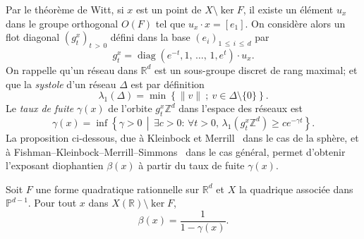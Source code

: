 \documentclass[AHL,Unicode,longabstracts,francais,published]{cedram}
\DeclareMathOperator{\diag}{diag}
\newcommand{\R}{\mathbb{R}}
\newcommand{\Z}{\mathbb{Z}}
\newcommand{\PP}{\mathbb{P}}
\let\oldexists\exists
\renewcommand*{\exists}{\mathrel{\oldexists}}
\let\oldforall\forall
\renewcommand*{\forall}{\mathrel{\oldforall}}
\begin{document}
Par le théorème de Witt, si $x$ est un point de $X\setminus\ker F$, il existe un élément $u_x$ dans le groupe orthogonal $O(F)$ tel que $u_x\cdot x = [e_1]$. On considère alors un flot diagonal $(g_t^x)_{t\,>\,0}$ défini dans la base $(e_i)_{1\,\leq\,i\,\leq\,d}$ par
\[
g_t^x = \diag\left(e^{-t},1,\,\dots,\,1,e^t\right)\cdot u_x.
\]
On rappelle qu'un réseau dans $\R^d$ est un sous-groupe discret de rang maximal; et que la \emph{systole} d'un réseau $\Delta$ est par définition
\[
\lambda_1(\Delta) = \min\left\{\|v\|\ ;\ v\in\Delta\setminus\{0\}\right\}.
\]
Le \emph{taux de fuite} $\gamma(x)$ de l'orbite $g_t^x\Z^d$ dans l'espace des réseaux est
\[
\gamma(x) = \inf\left\{\gamma>0\, \middle|\, \exists c>0:\,\forall t>0,\, \lambda_1\left(g_t^x\Z^d\right)\geq ce^{-\gamma t}\right\}.
\]
La proposition ci-dessous, due à Kleinbock et Merrill~\cite[Theorem~1.5]{kleinbock-merrill} dans le cas de la sphère, et à Fishman--Kleinbock--Merrill--Simmons~\cite[Lemma~7.2]{fkms_quadric} dans le cas général, permet d'obtenir l'exposant diophantien $\beta(x)$ à partir du taux de fuite $\gamma(x)$.

\begin{prop}\label{dani}
Soit $F$ une forme quadratique rationnelle sur $\R^d$ et $X$ la quadrique associée dans $\PP^{d-1}$. Pour tout $x$ dans $X(\R)\setminus\ker F$,
\[
\beta(x) = \frac{1}{1-\gamma(x)}.
\]
\end{prop}
\end{document}
